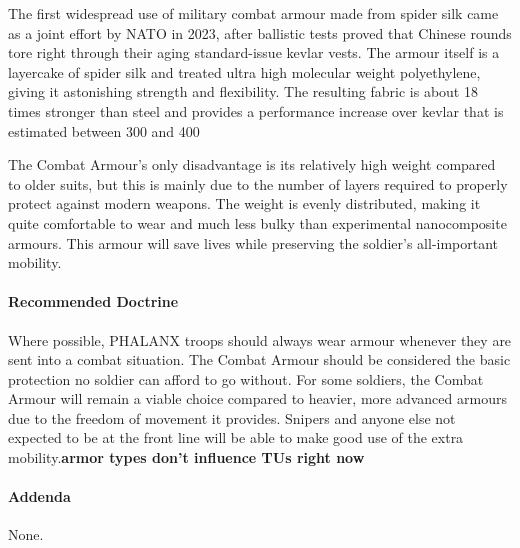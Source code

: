 The first widespread use of military combat armour made from spider silk came as a joint effort by NATO in 2023, after ballistic tests proved that Chinese rounds tore right through their aging standard-issue kevlar vests. The armour itself is a layercake of spider silk and treated ultra high molecular weight polyethylene, giving it astonishing strength and flexibility. The resulting fabric is about 18 times stronger than steel and provides a performance increase over kevlar that is estimated between 300 and 400

The Combat Armour's only disadvantage is its relatively high weight compared to older suits, but this is mainly due to the number of layers required to properly protect against modern weapons. The weight is evenly distributed, making it quite comfortable to wear and much less bulky than experimental nanocomposite armours. This armour will save lives while preserving the soldier's all-important mobility.
\paragraph*{Recommended Doctrine}
Where possible, PHALANX troops should always wear armour whenever they are sent into a combat situation. The Combat Armour should be considered the basic protection no soldier can afford to go without. For some soldiers, the Combat Armour will remain a viable choice compared to heavier, more advanced armours due to the freedom of movement it provides. Snipers and anyone else not expected to be at the front line will be able to make good use of the extra mobility.\textbf{armor types don't influence TUs right now}
\paragraph*{Addenda}
None.
